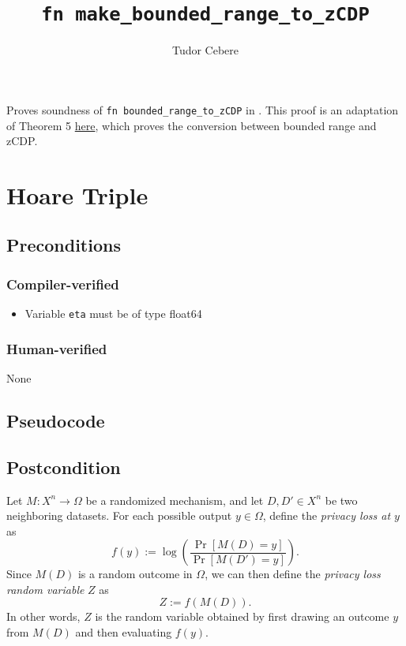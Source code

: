 \documentclass{article}
\title{\texttt{fn make\_bounded\_range\_to\_zCDP}}
\author{Tudor Cebere}
\begin{document}
\maketitle

\contrib
Proves soundness of \texttt{fn bounded\_range\_to\_zCDP} in .
This proof is an adaptation of Theorem 5 \href{https://differentialprivacy.org/exponential-mechanism-bounded-range/}{here}, which proves the conversion between bounded range \cite{durfee2019practical} and zCDP.

\section{Hoare Triple}
\subsection*{Preconditions}
\subsubsection*{Compiler-verified}
\begin{itemize}
    \item Variable \texttt{eta} must be of type float64
\end{itemize}

\subsubsection*{Human-verified}
None

\subsection*{Pseudocode}



\subsection*{Postcondition}
\begin{definition}
    Let $M : X^n \to \Omega$ be a randomized mechanism, and let $D, D' \in X^n$ be two neighboring datasets. 
    For each possible output $y \in \Omega$, define the \emph{privacy loss at $y$} as
    \begin{equation}
      f(y) := \log\left(\frac{\Pr[M(D) = y]}{\Pr[M(D') = y]}\right).
    \end{equation}
    Since $M(D)$ is a random outcome in $\Omega$, we can then define the \emph{privacy loss random variable} $Z$ as
    \begin{equation}
      Z := f(M(D)).
    \end{equation}
    In other words, $Z$ is the random variable obtained by first drawing an outcome $y$ from $M(D)$ and then evaluating $f(y)$.
  \end{definition}
  
\end{document}
